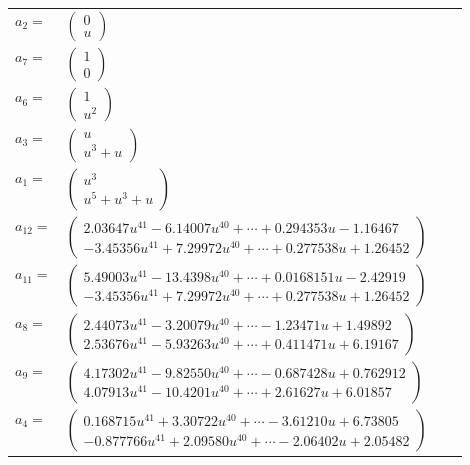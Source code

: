 \documentclass[1p]{elsarticle_modified}
\theoremstyle{definition}
\begin{document}
\begin{tabular}{m{7pt} m{180pt} m{7pt} m{180pt} }
\flushright $a_{2}=$&$\begin{pmatrix}0\\u\end{pmatrix}$ \\
\flushright $a_{7}=$&$\begin{pmatrix}1\\0\end{pmatrix}$ \\
\flushright $a_{6}=$&$\begin{pmatrix}1\\u^2\end{pmatrix}$ \\
\flushright $a_{3}=$&$\begin{pmatrix}u\\u^3+u\end{pmatrix}$ \\
\flushright $a_{1}=$&$\begin{pmatrix}u^3\\u^5+u^3+u\end{pmatrix}$ \\
\flushright $a_{12}=$&$\begin{pmatrix}2.03647 u^{41}-6.14007 u^{40}+\cdots+0.294353 u-1.16467\\-3.45356 u^{41}+7.29972 u^{40}+\cdots+0.277538 u+1.26452\end{pmatrix}$ \\
\flushright $a_{11}=$&$\begin{pmatrix}5.49003 u^{41}-13.4398 u^{40}+\cdots+0.0168151 u-2.42919\\-3.45356 u^{41}+7.29972 u^{40}+\cdots+0.277538 u+1.26452\end{pmatrix}$ \\
\flushright $a_{8}=$&$\begin{pmatrix}2.44073 u^{41}-3.20079 u^{40}+\cdots-1.23471 u+1.49892\\2.53676 u^{41}-5.93263 u^{40}+\cdots+0.411471 u+6.19167\end{pmatrix}$ \\
\flushright $a_{9}=$&$\begin{pmatrix}4.17302 u^{41}-9.82550 u^{40}+\cdots-0.687428 u+0.762912\\4.07913 u^{41}-10.4201 u^{40}+\cdots+2.61627 u+6.01857\end{pmatrix}$ \\
\flushright $a_{4}=$&$\begin{pmatrix}0.168715 u^{41}+3.30722 u^{40}+\cdots-3.61210 u+6.73805\\-0.877766 u^{41}+2.09580 u^{40}+\cdots-2.06402 u+2.05482\end{pmatrix}$ \\

\end{tabular}
\end{document}
